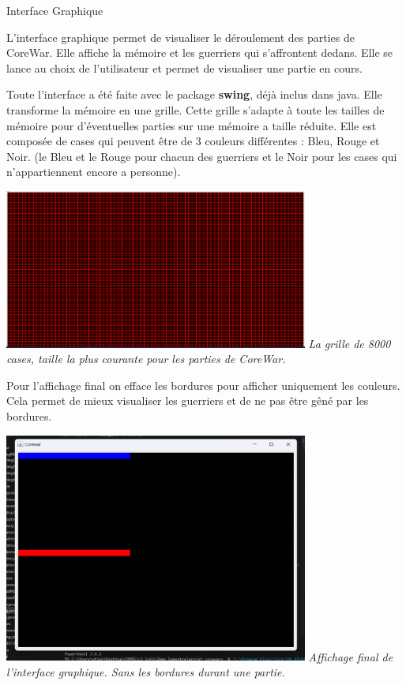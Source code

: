\documentclass[a4paper, 10pt]{article}
\begin{document}
    \begin{section}{Interface Graphique}
        \par
            L'interface graphique permet de visualiser le déroulement des parties de CoreWar. Elle affiche la mémoire et les guerriers qui s'affrontent dedans.
            Elle se lance au choix de l'utilisateur et permet de visualiser une partie en cours. 
            \smallskip
        \par
            Toute l'interface a été faite avec le package \textbf{swing}, déjà inclus dans java. Elle transforme la mémoire en une grille. Cette grille s'adapte à toute les tailles de mémoire pour d'éventuelles parties sur une mémoire a taille réduite. Elle est composée de cases qui peuvent être de 3 couleurs différentes : Bleu, Rouge et Noir. (le Bleu et le Rouge pour chacun des guerriers et le Noir pour les cases qui n'appartiennent encore a personne).
            \bigskip
        
            \includegraphics[width=10cm]{img/grille_interface.png}\newline
            \textit{La grille de 8000 cases, taille la plus courante pour les parties de CoreWar.}
            \bigskip

        \par
            Pour l'affichage final on efface les bordures pour afficher uniquement les couleurs. Cela permet de mieux visualiser les guerriers et de ne pas être gêné par les bordures.
            \bigskip

            \includegraphics[width=10cm]{img/display.jpg}\newline
            \textit{Affichage final de l'interface graphique. Sans les bordures durant une partie.}
            \bigskip
        

\end{section}
\end{document}
